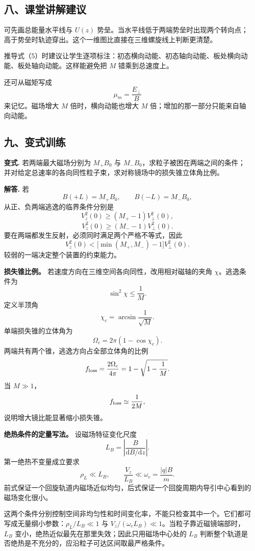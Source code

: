\documentclass[12pt,a4paper,UTF8]{ctexart}
\begin{document}
\subsection{八、课堂讲解建议}\label{ux516bux8bfeux5802ux8bb2ux89e3ux5efaux8bae-1}

可先画总能量水平线与 \(U(z)\)
势垒。当水平线低于两端势垒时出现两个转向点；高于势垒时轨迹穿出。这个一维图比直接在三维螺旋线上判断更清楚。

推导式（5）时建议让学生逐项标注：初态横向动能、初态轴向动能、板处横向动能、板处轴向动能。这样能避免把
\(M\) 错乘到总速度上。

还可从磁矩写成 \[
\mu_m=\frac{E_\perp}{B}
\] 来记忆。磁场增大 \(M\) 倍时，横向动能也增大 \(M\)
倍；增加的那一部分只能来自轴向动能。

\subsection{九、变式训练}\label{ux4e5dux53d8ux5f0fux8badux7ec3-1}

\textbf{变式.} 若两端最大磁场分别为 \(M_+B_0\) 与
\(M_-B_0\)，求粒子被困在两端之间的条件；并对给定总速率的各向同性粒子束，求对称镜场中的损失锥立体角比例。

\textbf{解答.} 若 \[
B(+L)=M_+B_0,\qquad B(-L)=M_-B_0,
\] 从正、负两端逃逸的临界条件分别是 \[
V_z^2(0)\ge(M_+-1)V_\perp^2(0),
\] \[
V_z^2(0)\ge(M_--1)V_\perp^2(0).
\] 要在两端都发生反射，必须同时满足两个严格不等式，因此 \[
\boxed{
V_z^2(0)
<\bigl[\min(M_+,M_-)-1\bigr]V_\perp^2(0)
}.
\] 较弱的一端决定整个装置的约束能力。

\textbf{损失锥比例。} 若速度方向在三维空间各向同性，改用相对磁轴的夹角
\(\chi\)。逃逸条件为 \[
\sin^2\chi\le\frac1M.
\] 定义半顶角 \[
\chi_c=\arcsin\frac1{\sqrt M}.
\] 单端损失锥的立体角为 \[
\Omega_c=2\pi(1-\cos\chi_c).
\] 两端共有两个锥，逃逸方向占全部立体角的比例 \[
f_{\rm loss}
=\frac{2\Omega_c}{4\pi}
=1-\sqrt{1-\frac1M}.
\] 当 \(M\gg1\)， \[
f_{\rm loss}\simeq\frac1{2M},
\] 说明增大镜比能显著缩小损失锥。

\textbf{绝热条件的定量写法。} 设磁场特征变化尺度 \[
L_B=\left|\frac{B}{\mathrm dB/\mathrm dz}\right|.
\] 第一绝热不变量成立要求 \[
\rho_L\ll L_B,
\qquad
\frac{V_z}{L_B}\ll\omega_c=\frac{|q|B}{m}.
\]
前式保证一个回旋轨道内磁场近似均匀，后式保证一个回旋周期内导引中心看到的磁场变化很小。

这两个条件分别控制空间非均匀性和时间变化率，不能只检查其中一个。它们都可写成无量纲小参数：\(\rho_L/L_B\ll1\)
与 \(V_z/(\omega_cL_B)\ll1\)。当粒子靠近磁镜端部时，\(L_B\)
变小，绝热近似最先在那里失效；因此只用磁场中心处的 \(L_B\)
判断整个轨道是否绝热是不充分的，应沿粒子可达区间取最严格条件。
\end{document}
